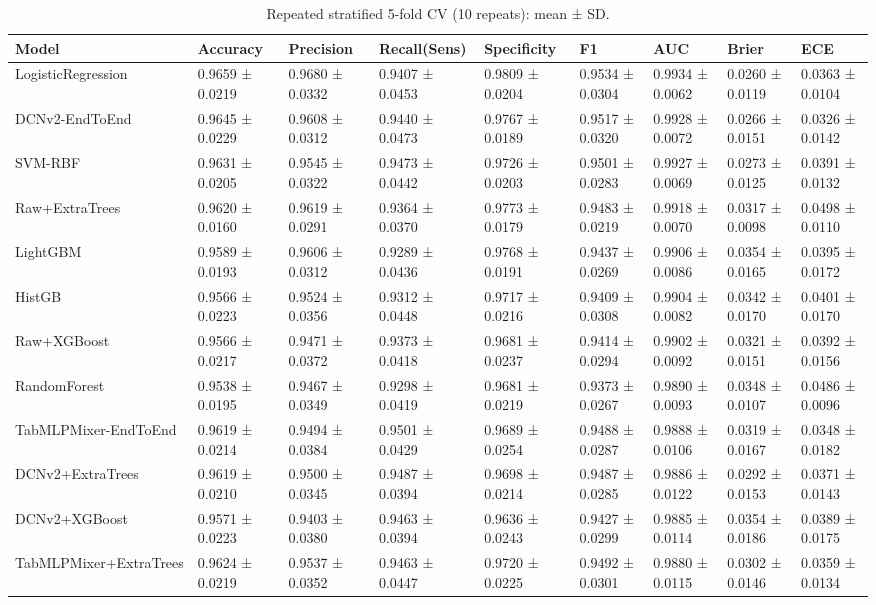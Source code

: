 \begin{table}
\caption{Repeated stratified 5-fold CV (10 repeats): mean ± SD.}
\label{tab:cv}
\begin{tabular}{lllllllll}
\toprule
Model & Accuracy & Precision & Recall(Sens) & Specificity & F1 & AUC & Brier & ECE \\
\midrule
LogisticRegression & 0.9659 ± 0.0219 & 0.9680 ± 0.0332 & 0.9407 ± 0.0453 & 0.9809 ± 0.0204 & 0.9534 ± 0.0304 & 0.9934 ± 0.0062 & 0.0260 ± 0.0119 & 0.0363 ± 0.0104 \\
DCNv2-EndToEnd & 0.9645 ± 0.0229 & 0.9608 ± 0.0312 & 0.9440 ± 0.0473 & 0.9767 ± 0.0189 & 0.9517 ± 0.0320 & 0.9928 ± 0.0072 & 0.0266 ± 0.0151 & 0.0326 ± 0.0142 \\
SVM-RBF & 0.9631 ± 0.0205 & 0.9545 ± 0.0322 & 0.9473 ± 0.0442 & 0.9726 ± 0.0203 & 0.9501 ± 0.0283 & 0.9927 ± 0.0069 & 0.0273 ± 0.0125 & 0.0391 ± 0.0132 \\
Raw+ExtraTrees & 0.9620 ± 0.0160 & 0.9619 ± 0.0291 & 0.9364 ± 0.0370 & 0.9773 ± 0.0179 & 0.9483 ± 0.0219 & 0.9918 ± 0.0070 & 0.0317 ± 0.0098 & 0.0498 ± 0.0110 \\
LightGBM & 0.9589 ± 0.0193 & 0.9606 ± 0.0312 & 0.9289 ± 0.0436 & 0.9768 ± 0.0191 & 0.9437 ± 0.0269 & 0.9906 ± 0.0086 & 0.0354 ± 0.0165 & 0.0395 ± 0.0172 \\
HistGB & 0.9566 ± 0.0223 & 0.9524 ± 0.0356 & 0.9312 ± 0.0448 & 0.9717 ± 0.0216 & 0.9409 ± 0.0308 & 0.9904 ± 0.0082 & 0.0342 ± 0.0170 & 0.0401 ± 0.0170 \\
Raw+XGBoost & 0.9566 ± 0.0217 & 0.9471 ± 0.0372 & 0.9373 ± 0.0418 & 0.9681 ± 0.0237 & 0.9414 ± 0.0294 & 0.9902 ± 0.0092 & 0.0321 ± 0.0151 & 0.0392 ± 0.0156 \\
RandomForest & 0.9538 ± 0.0195 & 0.9467 ± 0.0349 & 0.9298 ± 0.0419 & 0.9681 ± 0.0219 & 0.9373 ± 0.0267 & 0.9890 ± 0.0093 & 0.0348 ± 0.0107 & 0.0486 ± 0.0096 \\
TabMLPMixer-EndToEnd & 0.9619 ± 0.0214 & 0.9494 ± 0.0384 & 0.9501 ± 0.0429 & 0.9689 ± 0.0254 & 0.9488 ± 0.0287 & 0.9888 ± 0.0106 & 0.0319 ± 0.0167 & 0.0348 ± 0.0182 \\
DCNv2+ExtraTrees & 0.9619 ± 0.0210 & 0.9500 ± 0.0345 & 0.9487 ± 0.0394 & 0.9698 ± 0.0214 & 0.9487 ± 0.0285 & 0.9886 ± 0.0122 & 0.0292 ± 0.0153 & 0.0371 ± 0.0143 \\
DCNv2+XGBoost & 0.9571 ± 0.0223 & 0.9403 ± 0.0380 & 0.9463 ± 0.0394 & 0.9636 ± 0.0243 & 0.9427 ± 0.0299 & 0.9885 ± 0.0114 & 0.0354 ± 0.0186 & 0.0389 ± 0.0175 \\
TabMLPMixer+ExtraTrees & 0.9624 ± 0.0219 & 0.9537 ± 0.0352 & 0.9463 ± 0.0447 & 0.9720 ± 0.0225 & 0.9492 ± 0.0301 & 0.9880 ± 0.0115 & 0.0302 ± 0.0146 & 0.0359 ± 0.0134 \\

\end{tabular}
\end{table}

